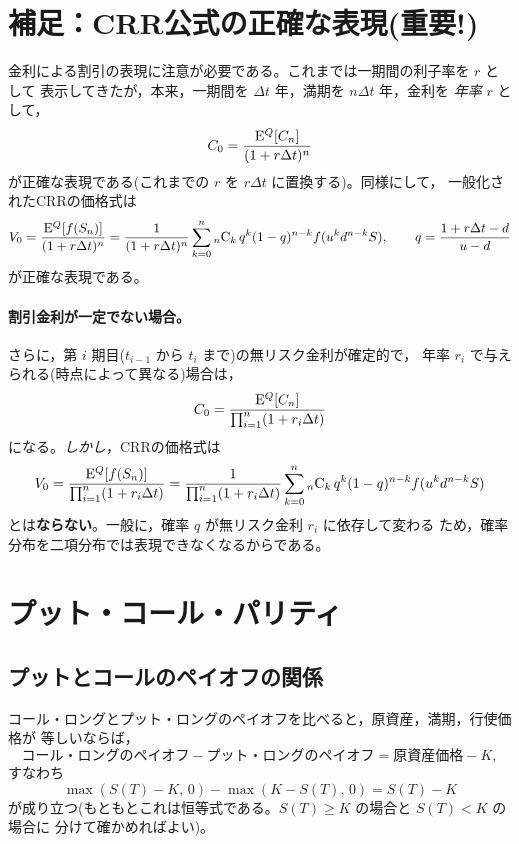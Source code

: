 \section{補足：CRR公式の正確な表現(重要!)}

金利による割引の表現に注意が必要である。これまでは一期間の利子率を $r$ として
表示してきたが，本来，一期間を $\Delta t$ 年，満期を $n\Delta t$ 年，金利を
\emph{年率} $r$ として，
\begin{equation}
C_0 = \frac{\mathrm{E}^Q[C_n]}{(1+r\Delta t)^n}
\end{equation}
が正確な表現である(これまでの $r$ を $r\Delta t$ に置換する)。同様にして，
一般化されたCRRの価格式は
\begin{equation}
V_0 = \frac{\mathrm{E}^Q[f(S_n)]}{(1+r\Delta t)^n}
= \frac{1}{(1+r\Delta t)^n}\sum_{k=0}^{n}
{}_n\mathrm{C}_k\,q^k(1-q)^{n-k}f(u^kd^{n-k}S),
\qquad
q = \frac{1 + r\Delta t - d}{u - d}
\end{equation}
が正確な表現である。

\paragraph{割引金利が一定でない場合。}
さらに，第 $i$ 期目($t_{i-1}$ から $t_i$ まで)の無リスク金利が確定的で，
年率 $r_i$ で与えられる(時点によって異なる)場合は，
\begin{equation}
C_0 = \frac{\mathrm{E}^Q[C_n]}{\prod_{i=1}^{n}(1 + r_i\Delta t)}
\end{equation}
になる。\emph{しかし}，CRRの価格式は
\[
V_0 = \frac{\mathrm{E}^Q[f(S_n)]}{\prod_{i=1}^n(1+r_i\Delta t)}
= \frac{1}{\prod_{i=1}^n(1+r_i\Delta t)}
\sum_{k=0}^{n}{}_n\mathrm{C}_k\,q^k(1-q)^{n-k}f(u^kd^{n-k}S)
\]
とは\textbf{ならない}。一般に，確率 $q$ が無リスク金利 $r_i$ に依存して変わる
ため，確率分布を二項分布では表現できなくなるからである。

\section{プット・コール・パリティ}

\subsection{プットとコールのペイオフの関係}

コール・ロングとプット・ロングのペイオフを比べると，原資産，満期，行使価格が
等しいならば，
\[
\text{コール・ロングのペイオフ} - \text{プット・ロングのペイオフ}
= \text{原資産価格} - K,
\]
すなわち
\begin{equation}
\max(S(T)-K,\,0) - \max(K-S(T),\,0) = S(T) - K
\label{eq:payoff-identity}
\end{equation}
が成り立つ(もともとこれは恒等式である。$S(T)\geq K$ の場合と $S(T)<K$ の場合に
分けて確かめればよい)。

